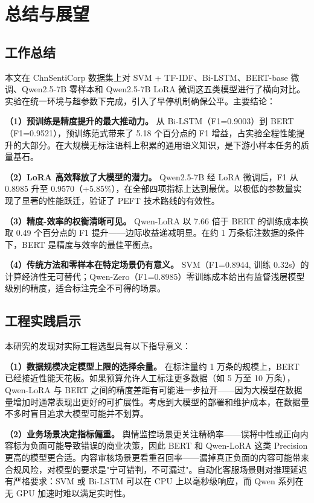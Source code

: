 \section{总结与展望}
\label{sec:conclusion}

\subsection{工作总结}

本文在 ChnSentiCorp 数据集上对 SVM + TF-IDF、Bi-LSTM、BERT-base 微调、Qwen2.5-7B 零样本和 Qwen2.5-7B LoRA 微调这五类模型进行了横向对比。实验在统一环境与超参数下完成，引入了早停机制确保公平。主要结论：

\textbf{（1）预训练是精度提升的最大推动力。} 从 Bi-LSTM（F1=0.9003）到 BERT（F1=0.9521），预训练范式带来了 5.18 个百分点的 F1 增益，占实验全程性能提升的大部分。在大规模无标注语料上积累的通用语义知识，是下游小样本任务的质量基石。

\textbf{（2）LoRA 高效释放了大模型的潜力。} Qwen2.5-7B 经 LoRA 微调后，F1 从 0.8985 升至 0.9570（+5.85\%），在全部四项指标上达到最优。以极低的参数量实现了显著的性能跃迁，验证了 PEFT 技术路线的有效性。

\textbf{（3）精度-效率的权衡清晰可见。} Qwen-LoRA 以 7.66 倍于 BERT 的训练成本换取 0.49 个百分点的 F1 提升——边际收益递减明显。在约 1 万条标注数据的条件下，BERT 是精度与效率的最佳平衡点。

\textbf{（4）传统方法和零样本在特定场景仍有意义。} SVM（F1=0.8944, 训练 0.32s）的计算经济性无可替代；Qwen-Zero（F1=0.8985）零训练成本给出有监督浅层模型级别的精度，适合标注完全不可得的场景。

\subsection{工程实践启示}

本研究的发现对实际工程选型具有以下指导意义：

\textbf{（1）数据规模决定模型上限的选择余量。} 在标注量约 1 万条的规模上，BERT 已经接近性能天花板。如果预算允许人工标注更多数据（如 5 万至 10 万条），Qwen-LoRA 与 BERT 之间的精度差距有可能进一步拉开——因为大模型在数据量增加时通常表现出更好的可扩展性。考虑到大模型的部署和维护成本，在数据量不多时盲目追求大模型可能并不划算。

\textbf{（2）业务场景决定指标偏重。} 舆情监控场景更关注精确率——误将中性或正向内容标为负面可能导致错误的商业决策，因此 BERT 和 Qwen-LoRA 这类 Precision 更高的模型更合适。内容审核场景更看重召回率——漏掉真正负面的内容可能带来合规风险，对模型的要求是"宁可错判，不可漏过"。自动化客服场景则对推理延迟有严格要求：SVM 或 Bi-LSTM 可以在 CPU 上以毫秒级响应，而 Qwen 系列在无 GPU 加速时难以满足实时性。

